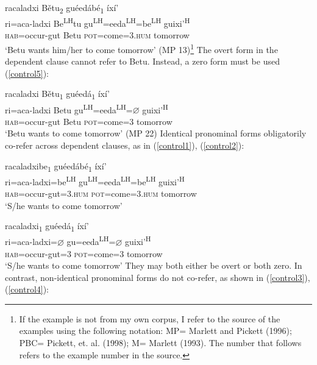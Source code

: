 \ea\label{control6}
\glll racaladxi B\v{e}tu\textsubscript{2} gu\'{e}ed\'{a}b\'{e}\textsubscript{1} \'{i}x\'{i}' \\
ri=aca-ladxi Be\textsuperscript{LH}tu gu\textsuperscript{LH}=eeda\textsuperscript{LH}=be\textsuperscript{LH}  guixi'\textsuperscript{H}  \\
\textsc{hab}=occur-gut Betu \textsc{pot}=come=\textsc{3.hum} tomorrow \\
\glt `Betu wants him/her to come tomorrow'  \hfill{(MP 13)}\footnote{If the example is not from my own corpus, I refer to the source of the examples using the following notation: MP= Marlett and Pickett (1996); PBC= Pickett, et. al. (1998); M= Marlett (1993). The number that follows refers to the example number in the source.}
\z
The overt form in the dependent clause cannot refer to Betu. Instead, a zero form must be used (\ref{control5}):

\ea\label{control5}
\glll racaladxi B\v{e}tu\textsubscript{1} gu\'{e}ed\'{a}\textsubscript{1} \'{i}x\'{i}' \\
ri=aca-ladxi Betu gu\textsuperscript{LH}=eeda\textsuperscript{LH}={$\varnothing$} guixi'\textsuperscript{H}  \\
\textsc{hab}=occur-gut Betu \textsc{pot}=come=\textsc{3} tomorrow \\
\glt `Betu wants to come tomorrow' \hfill{(MP 22)}
\z
Identical pronominal forms obligatorily co-refer across dependent clauses, as in (\ref{control1}), (\ref{control2}):

\ea\label{control1}
\glll racaladxibe\textsubscript{1} gu\'{e}ed\'{a}b\'{e}\textsubscript{1} \'{i}x\'{i}' \\
ri=aca-ladxi=be\textsuperscript{LH}  gu\textsuperscript{LH}=eeda\textsuperscript{LH}=be\textsuperscript{LH}  guixi'\textsuperscript{H}  \\
\textsc{hab}=occur-gut=\textsc{3.hum} \textsc{pot}=come=\textsc{3.hum} tomorrow \\
\glt `S/he wants to come tomorrow'
\z

\ea\label{control2}
\glll racaladxi\textsubscript{1} gu\'{e}ed\'{a}\textsubscript{1} \'{i}x\'{i}' \\
ri=aca-ladxi={$\varnothing$} gu=eeda\textsuperscript{LH}={$\varnothing$} guixi'\textsuperscript{H}  \\
\textsc{hab}=occur-gut=\textsc{3} \textsc{pot}=come=\textsc{3} tomorrow \\
\glt `S/he wants to come tomorrow'
\z
They may both either be overt or both zero. In contrast, non-identical pronominal forms do not co-refer, as shown in (\ref{control3}), (\ref{control4}):

